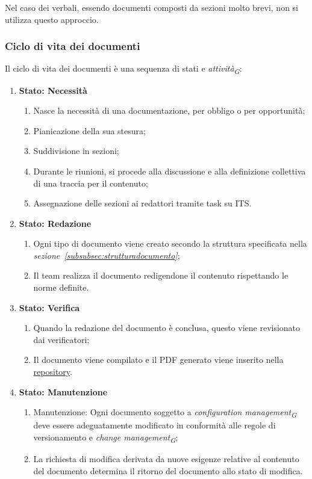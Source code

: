 Nel caso dei verbali, essendo documenti composti da sezioni molto brevi, non si utilizza questo approccio.

\subsubsection{Ciclo di vita dei documenti}
Il ciclo di vita dei documenti è una sequenza di stati e \textit{attività}\textsubscript{\textit{G}}:
\begin{enumerate}
    \item \textbf{Stato: Necessità}
          \begin{enumerate}
              \item Nasce la necessità di una documentazione, per obbligo o per opportunità;
              \item Pianicazione della sua stesura;
              \item Suddivisione in sezioni;
              \item Durante le riunioni, si procede alla discussione e alla definizione collettiva di una traccia per il contenuto;
              \item Assegnazione delle sezioni ai redattori tramite task su ITS. 
          \end{enumerate}
    \item \textbf{Stato: Redazione}
          \begin{enumerate}
              \item  Ogni tipo di documento viene creato secondo la struttura specificata nella \textit{sezione~\ref{subsubsec:strutturadocumento}};
              \item Il team realizza il documento redigendone il contenuto rispettando le norme definite.
          \end{enumerate}
    \item \textbf{Stato: Verifica}
          \begin{enumerate}
              \item Quando la redazione del documento è conclusa, questo viene revisionato dai verificatori;
              \item Il documento viene compilato e il PDF generato viene inserito nella \href{https://github.com/ByteOps-swe/Documents}{repository}.
          \end{enumerate}
    \item \textbf{Stato: Manutenzione}
          \begin{enumerate}
              \item Manutenzione: Ogni documento soggetto a \textit{configuration management}\textsubscript{\textit{G}} deve essere adeguatamente modificato in conformità alle regole di versionamento e \textit{change management}\textsubscript{\textit{G}};
              \item La richiesta di modifica derivata da nuove esigenze relative al contenuto del documento determina il ritorno del documento allo stato di modifica.
          \end{enumerate}
\end{enumerate}

